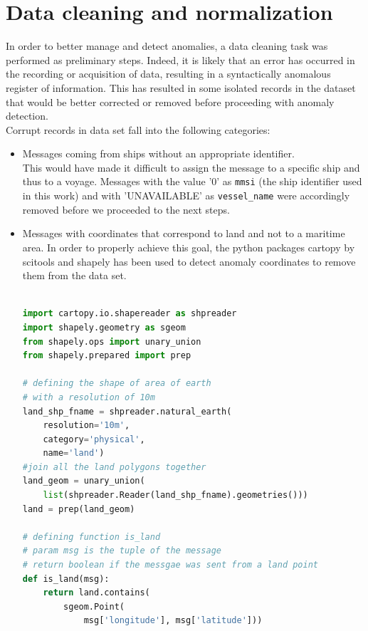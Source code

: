 \section{Data cleaning and normalization}
    In order to better manage and detect anomalies, a data cleaning task was performed as preliminary steps.
    Indeed, it is likely that an error has occurred in the recording or acquisition of data, resulting in a syntactically anomalous register of information. This has resulted in some isolated records in the dataset that would be better corrected or removed before proceeding with anomaly detection.
    \\
    Corrupt records in data set fall into the following categories:
    \begin{itemize}
        \item Messages coming from ships without an appropriate identifier.
        \\
        This would have made it difficult to assign the message to a specific ship and thus to a voyage. Messages with the value '0' as \verb|mmsi| (the ship identifier used in this work) and with 'UNAVAILABLE' as \verb|vessel_name| were accordingly removed before we proceeded to the next steps.
        
        \item Messages with coordinates that correspond to land and not to a maritime area.
        In order to properly achieve this goal, the python packages cartopy \cite{cartopy} by scitools and shapely \cite{shapely} has been used to detect anomaly coordinates to remove them from the data set.
        
        \begin{minipage}{\linewidth}
        \begin{lstlisting}[language=Python]

import cartopy.io.shapereader as shpreader
import shapely.geometry as sgeom
from shapely.ops import unary_union
from shapely.prepared import prep

# defining the shape of area of earth
# with a resolution of 10m
land_shp_fname = shpreader.natural_earth(
    resolution='10m', 
    category='physical', 
    name='land')
#join all the land polygons together
land_geom = unary_union(
    list(shpreader.Reader(land_shp_fname).geometries()))
land = prep(land_geom)

# defining function is_land
# param msg is the tuple of the message
# return boolean if the messgae was sent from a land point
def is_land(msg):
    return land.contains(
        sgeom.Point(
            msg['longitude'], msg['latitude']))
    

\end{lstlisting}
\end{minipage}
\end{itemize}
